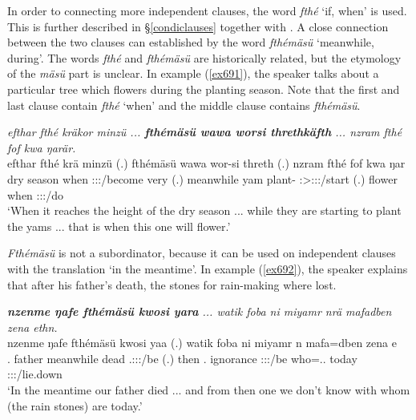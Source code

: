 In order to connecting more independent clauses, the word \emph{fthé} `if, when' is used. This is further described in \S{}\ref{condiclauses} together with  . A close  connection between the two clauses can established by the word \emph{fthémäsü} `meanwhile, during'. The words \emph{fthé} and \emph{fthémäsü} are historically related, but the etymology of the \emph{mäsü} part is unclear. In example (\ref{ex691}), the speaker talks about a particular tree which flowers during the planting season. Note that the first and last clause contain \emph{fthé} `when' and the middle clause contains \emph{fthémäsü}.

\begin{exe}
	\ex \emph{efthar fthé kräkor minzü ... \textbf{fthémäsü wawa worsi threthkäfth} ... nzram fthé fof kwa ŋarär.}\\
	\gll efthar fthé krä minzü (.) fthémäsü wawa wor-si threth (.) nzram fthé fof kwa ŋar\\
	{dry season} when \Stsg:\Sbj:\Irr:\Pfv/become very (.) meanwhile yam plant-\Nmlz{} \Stpl:\Sbj>\Stpl:\Obj:\Irr:\Pfv/start (.) flower when \Emph{} \Fut{} \Stsg:\Sbj:\Nonpast:\Ipfv/do\\
	\trans `When it reaches the height of the dry season ... while they are starting to plant the yams ... that is when this one will flower.'\\
	\label{ex691}
\end{exe}

\emph{Fthémäsü} is not a subordinator, because it can be used on independent clauses with the translation `in the meantime'. In example (\ref{ex692}), the speaker explains that after his father's death, the stones for rain-making where lost.

\begin{exe}
	\ex \emph{\textbf{nzenme ŋafe fthémäsü kwosi yara} ... watik foba ni miyamr nrä mafadben zena ethn.}\\
	\gll nzenme ŋafe fthémäsü kwosi yaa (.) watik foba ni miyamr n mafa=dben zena e\\
	\Fnsg.\Poss{} father meanwhile dead \Tsg.\Masc:\Sbj:\Pst:\Ipfv/be (.) then \Dist.\Abl{} \Fnsg{} ignorance \Fpl:\Sbj:\Nonpast:\Ipfv/be who=\Loc.\Anim.\Nsg{} today \Stpl:\Sbj:\Nonpast:\Ipfv/lie.down\\
	\trans `In the meantime our father died ... and from then one we don't know with whom (the rain stones) are today.'
	\label{ex692}
\end{exe}

